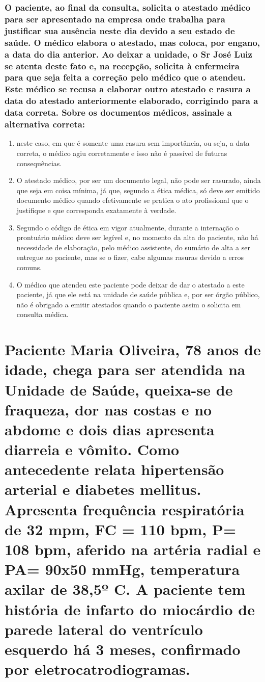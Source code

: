 \documentclass[11pt,notitlepage]{article}
\begin{document}
\section{O paciente, ao final da consulta, solicita o atestado médico para ser apresentado na empresa onde trabalha para justificar sua ausência neste dia devido a seu estado de saúde. O médico elabora o atestado, mas coloca, por engano, a data do dia anterior. Ao deixar a unidade, o Sr José Luiz se atenta deste fato e, na recepção, solicita à enfermeira para que seja feita a correção pelo médico que o atendeu. Este médico se recusa a elaborar outro atestado e rasura a data do atestado anteriormente elaborado, corrigindo para a data correta. Sobre os documentos médicos, assinale a alternativa correta:   }
\begin{multicols}{2}
	\setlength{\columnseprule}{0pt}
	\begin{enumerate}[label=(\alph*)]
		\item neste caso, em que é somente uma rasura sem importância, ou seja, a data correta, o médico agiu corretamente e isso não é passível de futuras consequências.
		\item O atestado médico, por ser um documento legal, não pode ser rasurado, ainda que seja em coisa mínima, já que, segundo a ética médica, só deve ser emitido documento médico quando efetivamente se pratica o ato profissional que o justifique e que corresponda exatamente à verdade. 
		\item Segundo o código de ética em vigor atualmente, durante a internação o prontuário médico deve ser legível e, no momento da alta do paciente, não há necessidade de elaboração, pelo médico assistente, do sumário de alta a ser entregue ao paciente, mas se o fizer, cabe algumas rasuras devido a erros comuns.
		\item O médico que atendeu este paciente pode deixar de dar o atestado a este paciente, já que ele está na unidade de saúde pública e, por ser órgão público, não é obrigado a emitir atestados quando o paciente assim o solicita em consulta médica.
	\end{enumerate}
\end{multicols}

\part{Paciente Maria Oliveira, 78 anos de idade, chega para ser atendida na Unidade de Saúde, queixa-se de fraqueza, dor nas costas e no abdome e dois dias apresenta diarreia e vômito. Como antecedente relata hipertensão arterial e diabetes mellitus. Apresenta frequência respiratória de 32 mpm, FC = 110 bpm, P= 108 bpm, aferido na artéria radial e PA= 90x50 mmHg, temperatura axilar de 38,5º C. A paciente tem história de infarto do miocárdio de parede lateral do ventrículo esquerdo há 3 meses, confirmado por eletrocatrodiogramas.}
\vspace{0.5cm}
\end{document}
